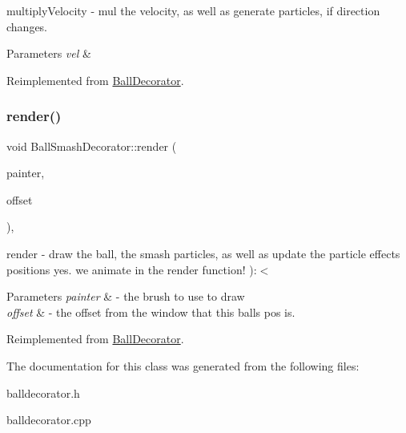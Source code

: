 multiply\+Velocity -\/ mul the velocity, as well as generate particles, if direction changes. 


\begin{DoxyParams}{Parameters}
{\em vel} & \\
\hline
\end{DoxyParams}


Reimplemented from \mbox{\hyperlink{class_ball_decorator_ad1a9139a5c41d17d0eebf007afb984e7}{Ball\+Decorator}}.

\mbox{\label{class_ball_smash_decorator_a8cbf47d481100f16f2376670fee9fdcc}} 
\subsubsection{\texorpdfstring{render()}{render()}}
{\footnotesize\ttfamily void Ball\+Smash\+Decorator\+::render (\begin{DoxyParamCaption}\item[{Q\+Painter \&}]{painter,  }\item[{const Q\+Vector2D \&}]{offset }\end{DoxyParamCaption})\hspace{0.3cm}{\ttfamily [override]}, {\ttfamily [virtual]}}



render -\/ draw the ball, the smash particles, as well as update the particle effects positions yes. we animate in the render function! )\+:$<$ 


\begin{DoxyParams}{Parameters}
{\em painter} & -\/ the brush to use to draw \\
\hline
{\em offset} & -\/ the offset from the window that this ball\textquotesingle{}s pos is. \\
\hline
\end{DoxyParams}


Reimplemented from \mbox{\hyperlink{class_ball_decorator_af8205f8033b2490ecd3365c24ff5cdeb}{Ball\+Decorator}}.



The documentation for this class was generated from the following files\+:\begin{DoxyCompactItemize}
\item 
balldecorator.\+h\item 
balldecorator.\+cpp\end{DoxyCompactItemize}

